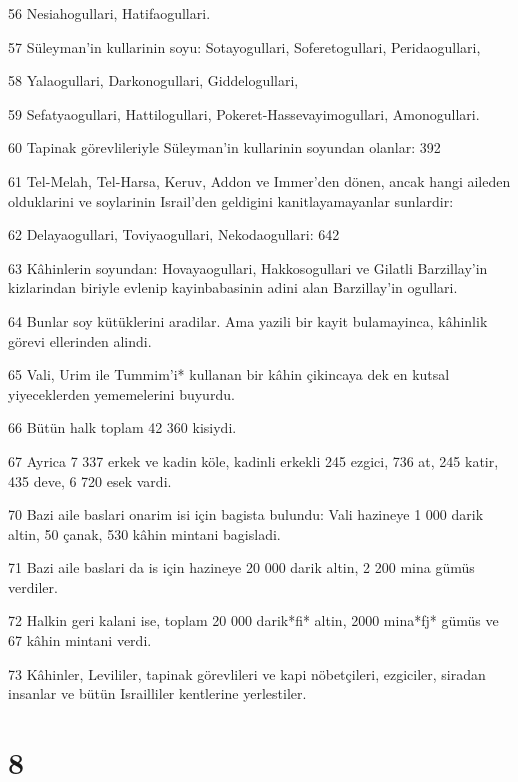 \par 56 Nesiahogullari, Hatifaogullari.
\par 57 Süleyman'in kullarinin soyu: Sotayogullari, Soferetogullari, Peridaogullari,
\par 58 Yalaogullari, Darkonogullari, Giddelogullari,
\par 59 Sefatyaogullari, Hattilogullari, Pokeret-Hassevayimogullari, Amonogullari.
\par 60 Tapinak görevlileriyle Süleyman'in kullarinin soyundan olanlar: 392
\par 61 Tel-Melah, Tel-Harsa, Keruv, Addon ve Immer'den dönen, ancak hangi aileden olduklarini ve soylarinin Israil'den geldigini kanitlayamayanlar sunlardir:
\par 62 Delayaogullari, Toviyaogullari, Nekodaogullari: 642
\par 63 Kâhinlerin soyundan: Hovayaogullari, Hakkosogullari ve Gilatli Barzillay'in kizlarindan biriyle evlenip kayinbabasinin adini alan Barzillay'in ogullari.
\par 64 Bunlar soy kütüklerini aradilar. Ama yazili bir kayit bulamayinca, kâhinlik görevi ellerinden alindi.
\par 65 Vali, Urim ile Tummim'i* kullanan bir kâhin çikincaya dek en kutsal yiyeceklerden yememelerini buyurdu.
\par 66 Bütün halk toplam 42 360 kisiydi.
\par 67 Ayrica 7 337 erkek ve kadin köle, kadinli erkekli 245 ezgici, 736 at, 245 katir, 435 deve, 6 720 esek vardi.
\par 70 Bazi aile baslari onarim isi için bagista bulundu: Vali hazineye 1 000 darik altin, 50 çanak, 530 kâhin mintani bagisladi.
\par 71 Bazi aile baslari da is için hazineye 20 000 darik altin, 2 200 mina gümüs verdiler.
\par 72 Halkin geri kalani ise, toplam 20 000 darik*fi* altin, 2000 mina*fj* gümüs ve 67 kâhin mintani verdi.
\par 73 Kâhinler, Levililer, tapinak görevlileri ve kapi nöbetçileri, ezgiciler, siradan insanlar ve bütün Israilliler kentlerine yerlestiler.

\chapter{8}

